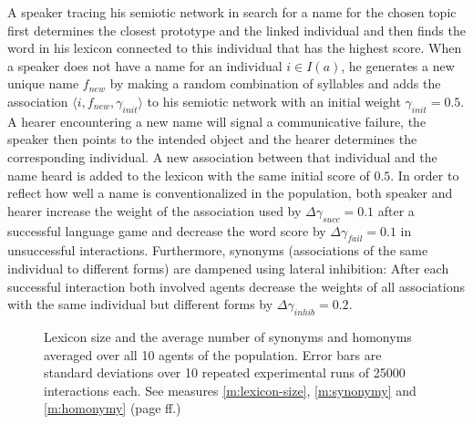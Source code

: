 A speaker tracing his semiotic network in search for a name for the
chosen topic first determines the closest prototype and the linked
individual and then finds the word in his lexicon connected to this
individual that has the highest score. When a speaker does not have a
name for an individual $i \in I(a)$, he generates a new unique name
$f_{new}$ by making a random combination of syllables and adds the
association $\langle i,f_{new},\gamma_{init} \rangle$ to his semiotic
network with an initial weight $\gamma_{init}=0.5$. A hearer
encountering a new name will signal a communicative failure, the
speaker then points to the intended object and the hearer determines
the corresponding individual. A new association between that
individual and the name heard is added to the lexicon with the same
initial score of $0.5$. In order to reflect how well a name is
conventionalized in the population, both speaker and hearer increase
the weight of the association used by $\Delta\gamma_{succ}=0.1$ after
a successful language game and decrease the word score by
$\Delta\gamma_{fail}=0.1$ in unsuccessful interactions. Furthermore,
synonyms (associations of the same individual to different forms) are
dampened using lateral inhibition: After each successful interaction
both involved agents decrease the weights of all associations with the
same individual but different forms by $\Delta\gamma_{inhib}=0.2$.

\begin{figure}[t]
  \caption{Lexicon size and the average number of synonyms and
    homonyms averaged over all 10 agents of the population. Error bars
    are standard deviations over 10 repeated experimental runs of
    25000 interactions each. See measures \ref{m:lexicon-size},
    \ref{m:synonymy} and \ref{m:homonymy} (page
    \pageref{m:lexicon-size} ff.)}
  \label{f:gng-number-of-words-and-synonyms-and-homonyms}
\end{figure}

